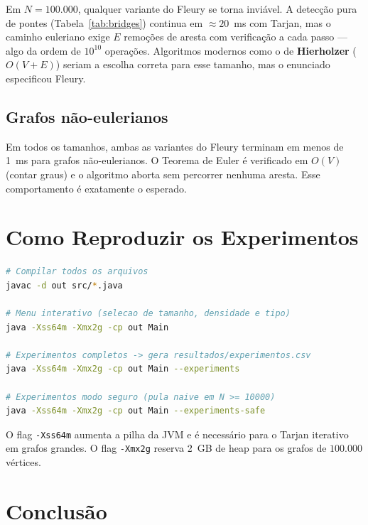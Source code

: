 \documentclass[12pt]{article}
\begin{document}
Em $N=100.000$, qualquer variante do Fleury se torna inviável. A detecção
pura de pontes (Tabela~\ref{tab:bridges}) continua em $\approx 20$~ms com
Tarjan, mas o caminho euleriano exige $E$ remoções de aresta com
verificação a cada passo --- algo da ordem de $10^{10}$ operações.
Algoritmos modernos como o de \textbf{Hierholzer} ($O(V{+}E)$)
\cite{hierholzer} seriam a escolha correta para esse tamanho, mas o
enunciado especificou Fleury.

\subsection{Grafos não-eulerianos}

Em todos os tamanhos, ambas as variantes do Fleury terminam em menos de
1~ms para grafos não-eulerianos. O Teorema de Euler é verificado em $O(V)$
(contar graus) e o algoritmo aborta sem percorrer nenhuma aresta. Esse
comportamento é exatamente o esperado.

\section{Como Reproduzir os Experimentos}

\begin{lstlisting}[language=bash]
# Compilar todos os arquivos
javac -d out src/*.java

# Menu interativo (selecao de tamanho, densidade e tipo)
java -Xss64m -Xmx2g -cp out Main

# Experimentos completos -> gera resultados/experimentos.csv
java -Xss64m -Xmx2g -cp out Main --experiments

# Experimentos modo seguro (pula naive em N >= 10000)
java -Xss64m -Xmx2g -cp out Main --experiments-safe
\end{lstlisting}

O flag \texttt{-Xss64m} aumenta a pilha da JVM e é necessário para o
Tarjan iterativo em grafos grandes. O flag \texttt{-Xmx2g} reserva 2~GB
de heap para os grafos de $100.000$ vértices.

\section{Conclusão}
\end{document}
